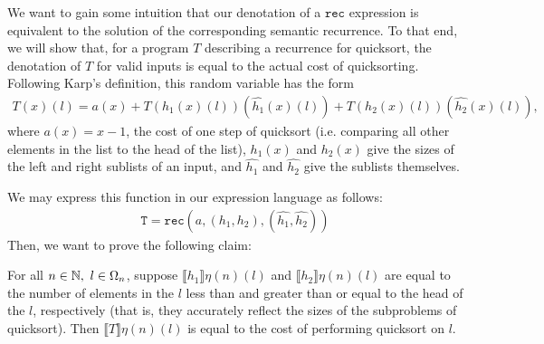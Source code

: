 We want to gain some intuition that our denotation of a $\texttt{rec}$ expression is equivalent to the solution of
the corresponding semantic recurrence. To that end, we will show that, for a program $T$ describing a recurrence for 
quicksort, the denotation of $T$ for valid inputs is equal to the actual cost of quicksorting. 
 Following Karp's definition, this random variable has the form 
\begin{align*}
T(x)(l) = a(x) + T(h_1(x)(l))(\hat{h_1}(x)(l)) + T(h_2(x)(l))(\hat{h_2}(x)(l)), 
\end{align*}
where $a(x) = x-1$, the cost of one step of quicksort (i.e. comparing all other elements
in the list to the head of the list), $h_1(x)$ and $h_2(x)$ give the sizes of the left and right sublists of an input, and
$\hat{h_1}$ and $\hat{h_2}$ give the sublists themselves. 

We may express this function in our expression language
as follows:
\begin{align*}
\texttt{T} = \texttt{rec}(a, (h_1, h_2), (\hat{h_1}, \hat{h_2}))
\end{align*}
Then, we want to prove the following claim:
\begin{thm}
For all $n \in \mathbb{N}, \ l \in \Omega_n$, suppose $\llbracket h_1 \rrbracket\eta (n)(l)$ and $\llbracket h_2 \rrbracket\eta (n)(l)$
are equal to the number of elements in the $l$ less than and greater than or equal to the head of the $l$, respectively (that is,
they accurately reflect the sizes of the subproblems of quicksort). Then $\llbracket T \rrbracket\eta (n)(l)$ is equal to the cost
of performing quicksort on $l$. 
\end{thm} 

